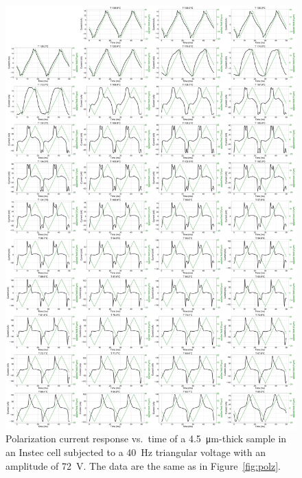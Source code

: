 \documentclass[superscriptaddress,floatfix,onecolumn,notitlepage]{revtex4-1}
\begin{document}
\begin{figure}[H]
    \centering
    \includegraphics[width=.85\textwidth]{montageForSupp.pdf}
    \caption{Polarization current response vs.\ time of a \SI{4.5}{\micro\metre}-thick  sample in an Instec cell subjected  to a \SI{40}{\hertz} triangular voltage with an amplitude of \SI{72}{\volt}. The data are the same as in Figure~\ref{fig:polz}.}
\end{figure}
\end{document}

